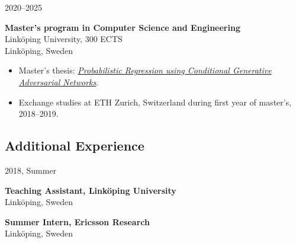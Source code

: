 \begin{labeling}{2020--2025}
\begin{itemize}
        \end{itemize}
    \item [2015--2020]
        \textbf{Master's program in Computer Science and Engineering}\\%
        Linköping University, 300 ECTS\\
        {\footnotesize Linköping, Sweden}
        \begin{itemize}
            \item Master's thesis: \href{http://urn.kb.se/resolve?urn=urn:nbn:se:liu:diva-166637}{\textit{Probabilistic Regression using Conditional Generative Adversarial Networks}}.
            \item Exchange studies at ETH Zurich, Switzerland during first year of master's, 2018--2019.
        \end{itemize}
\end{labeling}

\subsection*{Additional Experience}
\begin{labeling}{2018, Summer}
    \item [2016 -- 2019] \textbf{Teaching Assistant, Linköping University}\\%
    {\footnotesize Linköping, Sweden}
\item [2018, Summer] \textbf{Summer Intern, Ericsson Research}\\%
    {\footnotesize Linköping, Sweden}
\end{labeling}
